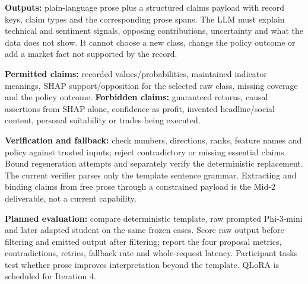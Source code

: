 \textbf{Outputs:} plain-language prose plus a structured claims payload with record keys, claim types and the corresponding prose spans. The LLM must explain technical and sentiment signals, opposing contributions, uncertainty and what the data does not show. It cannot choose a new class, change the policy outcome or add a market fact not supported by the record.

\textbf{Permitted claims:} recorded values/probabilities, maintained indicator meanings, SHAP support/opposition for the selected raw class, missing coverage and the policy outcome. \textbf{Forbidden claims:} guaranteed returns, causal assertions from SHAP alone, confidence as profit, invented headline/social content, personal suitability or trades being executed.

\textbf{Verification and fallback:} check numbers, directions, ranks, feature names and policy against trusted inputs; reject contradictory or missing essential claims. Bound regeneration attempts and separately verify the deterministic replacement. The current verifier parses only the template sentence grammar. Extracting and binding claims from free prose through a constrained payload is the Mid-2 deliverable, not a current capability.

\textbf{Planned evaluation:} compare deterministic template, raw prompted Phi-3-mini and later adapted student on the same frozen cases. Score raw output before filtering and emitted output after filtering; report the four proposal metrics, contradictions, retries, fallback rate and whole-request latency. Participant tasks test whether prose improves interpretation beyond the template. QLoRA is scheduled for Iteration 4.

